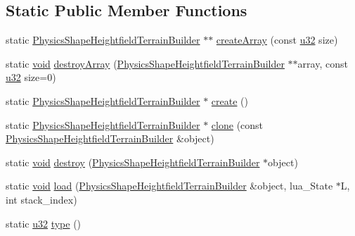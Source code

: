 \subsection*{Static Public Member Functions}
\begin{DoxyCompactItemize}
\item 
static \mbox{\hyperlink{classnjli_1_1_physics_shape_heightfield_terrain_builder}{Physics\+Shape\+Heightfield\+Terrain\+Builder}} $\ast$$\ast$ \mbox{\hyperlink{classnjli_1_1_physics_shape_heightfield_terrain_builder_a29698c623a44d1dd7b84b7d60af1862a}{create\+Array}} (const \mbox{\hyperlink{_util_8h_a10e94b422ef0c20dcdec20d31a1f5049}{u32}} size)
\item 
static \mbox{\hyperlink{_thread_8h_af1e856da2e658414cb2456cb6f7ebc66}{void}} \mbox{\hyperlink{classnjli_1_1_physics_shape_heightfield_terrain_builder_ae264b58d592d583bb949af7985353581}{destroy\+Array}} (\mbox{\hyperlink{classnjli_1_1_physics_shape_heightfield_terrain_builder}{Physics\+Shape\+Heightfield\+Terrain\+Builder}} $\ast$$\ast$array, const \mbox{\hyperlink{_util_8h_a10e94b422ef0c20dcdec20d31a1f5049}{u32}} size=0)
\item 
static \mbox{\hyperlink{classnjli_1_1_physics_shape_heightfield_terrain_builder}{Physics\+Shape\+Heightfield\+Terrain\+Builder}} $\ast$ \mbox{\hyperlink{classnjli_1_1_physics_shape_heightfield_terrain_builder_a7352753e6659e11627dd2fc1a2b505dd}{create}} ()
\item 
static \mbox{\hyperlink{classnjli_1_1_physics_shape_heightfield_terrain_builder}{Physics\+Shape\+Heightfield\+Terrain\+Builder}} $\ast$ \mbox{\hyperlink{classnjli_1_1_physics_shape_heightfield_terrain_builder_a6d732c7196301cd10262b5f3e9152057}{clone}} (const \mbox{\hyperlink{classnjli_1_1_physics_shape_heightfield_terrain_builder}{Physics\+Shape\+Heightfield\+Terrain\+Builder}} \&object)
\item 
static \mbox{\hyperlink{_thread_8h_af1e856da2e658414cb2456cb6f7ebc66}{void}} \mbox{\hyperlink{classnjli_1_1_physics_shape_heightfield_terrain_builder_a0ddb0264a5eb73d7eaa268994b858822}{destroy}} (\mbox{\hyperlink{classnjli_1_1_physics_shape_heightfield_terrain_builder}{Physics\+Shape\+Heightfield\+Terrain\+Builder}} $\ast$object)
\item 
static \mbox{\hyperlink{_thread_8h_af1e856da2e658414cb2456cb6f7ebc66}{void}} \mbox{\hyperlink{classnjli_1_1_physics_shape_heightfield_terrain_builder_a39217f232133ddeb229e818ffa7d5362}{load}} (\mbox{\hyperlink{classnjli_1_1_physics_shape_heightfield_terrain_builder}{Physics\+Shape\+Heightfield\+Terrain\+Builder}} \&object, lua\+\_\+\+State $\ast$L, int stack\+\_\+index)
\item 
static \mbox{\hyperlink{_util_8h_a10e94b422ef0c20dcdec20d31a1f5049}{u32}} \mbox{\hyperlink{classnjli_1_1_physics_shape_heightfield_terrain_builder_ab9ae03e71c637f08bcb627f36a516ff0}{type}} ()
\end{DoxyCompactItemize}
